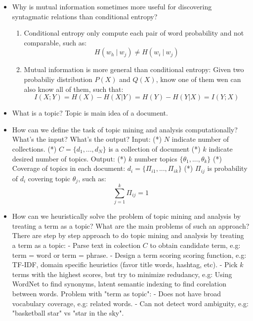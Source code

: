 \documentclass[11pt]{article}
\providecommand{\tightlist}{%
      \setlength{\itemsep}{0pt}\setlength{\parskip}{0pt}}
\begin{document}
    \begin{itemize}
\tightlist
\item
  Why is mutual information sometimes more useful for discovering
  syntagmatic relations than conditional entropy?

  \begin{enumerate}
  \def\labelenumi{\arabic{enumi}.}
  \tightlist
  \item
    Conditional entropy only compute each pair of word probability and
    not comparable, such as: \[H(w_h \ | \ w_j) \neq H(w_i \ | \ w_j)\] 
  \item
    Mutual information is more general than conditional entropy: Given
    two probabiliy distribution \(P(X)\) and \(Q(X)\), know one of them
    wen can also know all of them, such that:
    \[I(X;Y)=H(X)-H(X|Y)=H(Y)-H(Y|X)=I(Y;X)\] 
  \end{enumerate}
\end{itemize}

    \begin{itemize}
\tightlist
\item
  What is a topic? Topic is main idea of a document. 
\end{itemize}

    \begin{itemize}
\tightlist
\item
  How can we define the task of topic mining and analysis
  computationally? What's the input? What's the output? Input: (*) \(N\)
  indicate number of collections. (*) \(C=\{d_1, ..., d_N\}\) is a
  collection of document (*) \(k\) indicate desired number of topics.
  Output: (*) \(k\) number topics \(\{\theta_1, ..., \theta_k\}\) (*)
  Coverage of topics in each document:
  \(d_i = \{\Pi_{i1}, ..., \Pi_{ik}\}\) (*) \(\Pi_{ij}\) is probability
  of \(d_i\) covering topic \(\theta_j\), such as:
  \[\sum\limits_{j=1}^k \Pi_{ij} = 1\] 
\end{itemize}

    \begin{itemize}
\tightlist
\item
  How can we heuristically solve the problem of topic mining and
  analysis by treating a term as a topic? What are the main problems of
  such an approach? There are step by step approach to do topic mining
  and analysis by treating a term as a topic: - Parse text in colection
  \(C\) to obtain candidate term, e.g: term = word or term = phrase. -
  Design a term scoring scoring function, e.g: TF-IDF, domain specific
  heuristics (favor title words, hashtag, etc). - Pick \(k\) terms with
  the highest scores, but try to minimize redudancy, e.g: Using WordNet
  to find synonyms, latent semantic indexing to find corelation between
  words. Problem with "term as topic": - Does not have broad vocabulary
  coverage, e.g: related words. - Can not detect word ambiguity, e.g:
  "basketball star" vs "star in the sky". 
\end{itemize}
\end{document}

